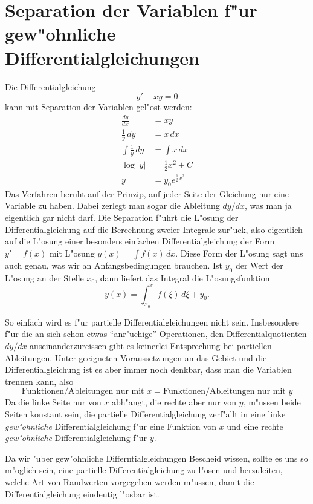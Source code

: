 \section{Separation der Variablen f"ur gew"ohnliche Differentialgleichungen}
Die Differentialgleichung 
\begin{equation}
y'-xy=0
\label{separation:ode}
\end{equation}
kann mit Separation der Variablen gel"ost werden:
\begin{align*}
\frac{dy}{dx}&=xy\\
\frac1y\,dy&=x\,dx\\
\int\frac1y\,dy&=\int x\,dx\\
\log|y|&=\frac12x^2+C\\
y&=y_0e^{\frac12x^2}
\end{align*}
Das Verfahren beruht auf der Prinzip, auf jeder Seite der Gleichung
nur eine Variable zu haben.
Dabei zerlegt man sogar die Ableitung $dy/dx$, was man ja eigentlich
gar nicht darf.
Die Separation f"uhrt die L"osung der Differentialgleichung auf die
Berechnung zweier Integrale zur"uck, also eigentlich auf die
L"osung einer besonders einfachen Differentialgleichung der Form $y'=f(x)$
mit L"osung $y(x)=\int f(x)\,dx$.
Diese Form der L"osung sagt uns auch genau, was wir an Anfangsbedingungen
brauchen.
Ist $y_0$ der Wert der L"osung an der Stelle $x_0$, dann liefert
das Integral die L"osungsfunktion
\[
y(x)=\int_{x_0}^xf(\xi)\,d\xi + y_0.
\]

So einfach wird es f"ur partielle Differentialgleichungen nicht sein.
Insbesondere f"ur die an sich schon etwas ``anr"uchige'' Operationen,
den Differentialquotienten $dy/dx$ auseinanderzureissen gibt es keinerlei
Entsprechung bei partiellen Ableitungen.
Unter geeigneten Voraussetzungen an das Gebiet und die Differentialgleichung
ist es aber immer noch denkbar, dass man die Variablen trennen kann,
also 
\[
\text{Funktionen/Ableitungen nur mit $x$} = \text{Funktionen/Ableitungen nur mit $y$}
\]
Da die linke Seite nur von $x$ abh"angt, die rechte aber nur von $y$, m"ussen
beide Seiten konstant sein, die partielle Differentialgleichung zerf"allt
in eine linke {\em gew"ohnliche} Differentialgleichung f"ur eine Funktion von
$x$ und eine rechte {\em gew"ohnliche} Differentialgleichung f"ur $y$.

Da wir "uber gew"ohnliche Differntialgleichungen Bescheid wissen, sollte
es uns so m"oglich sein, eine partielle Differentialgleichung zu l"osen
und herzuleiten, welche Art von Randwerten vorgegeben werden m"ussen, damit
die Differentialgleichung eindeutig l"osbar ist.

